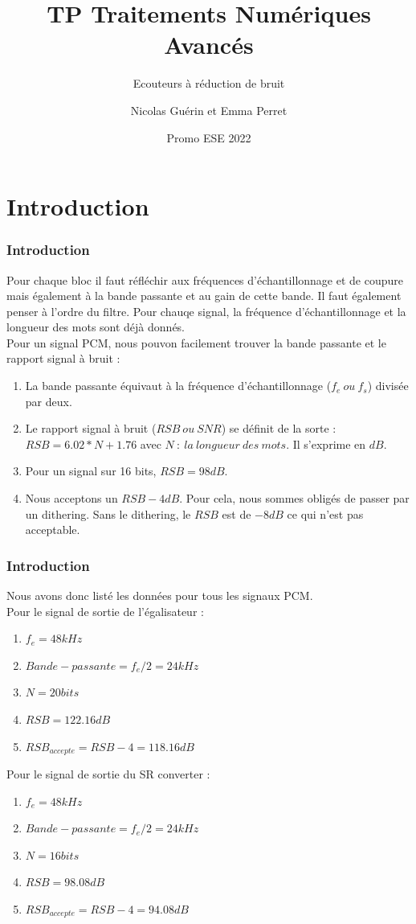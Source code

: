 \documentclass[
10pt,
aspectratio=169,
]{beamer}
\title{TP Traitements Numériques Avancés}
\subtitle{Ecouteurs à réduction de bruit}
\date{Promo ESE 2022}
\author{Nicolas Guérin et Emma Perret}
\begin{document}
\begin{frame}
\titlepage
\end{frame}

\section{Introduction}
\begin{frame} 
\frametitle{Introduction} 
Pour chaque bloc il faut réfléchir aux fréquences d'échantillonnage et de coupure mais également à la bande passante et au gain de cette bande. Il faut également penser à l'ordre du filtre. Pour chauqe signal, la fréquence d'échantillonnage et la longueur des mots sont déjà donnés.\\
Pour un signal PCM, nous pouvon facilement trouver la bande passante et le rapport signal à bruit :
\begin{enumerate} 
\item La bande passante équivaut à la fréquence d'échantillonnage ($f_e ~ ou ~ f_s$) divisée par deux.
\item Le rapport signal à bruit ($RSB ~ ou ~ SNR$) se définit de la sorte : $RSB = 6.02 * N + 1.76 $ avec $N ~ : ~ la ~ longueur ~ des ~ mots$. Il s'exprime en $dB$.
\item Pour un signal sur 16 bits, $RSB = 98 dB$.
\item Nous acceptons un $RSB - 4dB$. Pour cela, nous sommes obligés de passer par un dithering. Sans le dithering, le $RSB$ est de $-8 dB$ ce qui n'est pas acceptable.
\end{enumerate}
\end{frame}

\begin{frame} 
\frametitle{Introduction} 
Nous avons donc listé les données pour tous les signaux PCM.\\
Pour le signal de sortie de l'égalisateur : 
\begin{enumerate} 
\item $f_e = 48 kHz$
\item $Bande-passante = f_e/2 = 24 kHz$
\item $N = 20 bits$
\item $RSB = 122.16 dB$
\item $RSB_{accepte} = RSB - 4 = 118.16 dB$

\end{enumerate}
\vspace*{0.7cm}
Pour le signal de sortie du SR converter : 
\begin{enumerate} 
\item $f_e = 48 kHz$
\item $Bande-passante = f_e/2 = 24 kHz$
\item $N = 16 bits$
\item $RSB = 98.08 dB$
\item $RSB_{accepte} = RSB - 4 = 94.08 dB$

\end{enumerate}
\end{frame}
\end{document}
